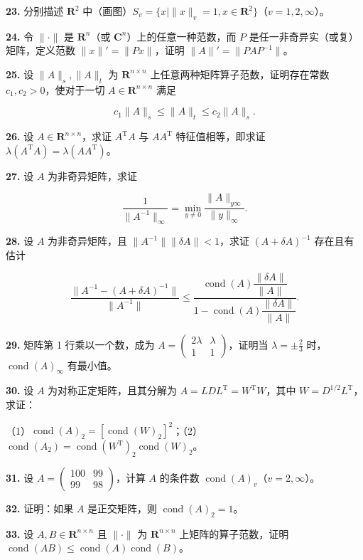 \documentclass[
  10pt,
  fontset=fandol]{ctexart}
\begin{document}
\textbf{23.} 分别描述 \(\mathbf R^2\) 中（画图）\(S_v=\{x\mid\|x\|_v=1,x\in\mathbf R^2\}\)（\(v=1,2,\infty\)）。

\textbf{24.} 令 \(\|\cdot\|\) 是 \(\mathbf R^n\)（或 \(\mathbf C^n\)）上的任意一种范数，而 \(P\) 是任一非奇异实（或复）矩阵，定义范数 \(\|x\|'=\|Px\|\)，证明 \(\|A\|'=\|PAP^{-1}\|\)。

\textbf{25.} 设 \(\|A\|_s,\|A\|_t\) 为 \(\mathbf R^{n\times n}\) 上任意两种矩阵算子范数，证明存在常数 \(c_1,c_2>0\)，使对于一切 \(A\in\mathbf R^{n\times n}\) 满足

\[
c_1\|A\|_s\leqslant\|A\|_t\leqslant c_2\|A\|_s.
\]

\textbf{26.} 设 \(A\in\mathbf R^{n\times n}\)，求证 \(A^{\mathrm T}A\) 与 \(AA^{\mathrm T}\) 特征值相等，即求证 \(\lambda(A^{\mathrm T}A)=\lambda(AA^{\mathrm T})\)。

\textbf{27.} 设 \(A\) 为非奇异矩阵，求证

\[
\frac1{\|A^{-1}\|_\infty}=\min_{y\neq0}\frac{\|A\|_{y\infty}}{\|y\|_\infty}.
\]

\textbf{28.} 设 \(A\) 为非奇异矩阵，且 \(\|A^{-1}\|\|\delta A\|<1\)，求证 \((A+\delta A)^{-1}\) 存在且有估计

\[
\frac{\|A^{-1}-(A+\delta A)^{-1}\|}{\|A^{-1}\|}
\leqslant
\frac{\operatorname{cond}(A)\dfrac{\|\delta A\|}{\|A\|}}
{1-\operatorname{cond}(A)\dfrac{\|\delta A\|}{\|A\|}}.
\]

\textbf{29.} 矩阵第 1 行乘以一个数，成为 \(A=\begin{pmatrix}2\lambda&\lambda\\1&1\end{pmatrix}\)，证明当 \(\lambda=\pm\frac23\) 时，\(\operatorname{cond}(A)_\infty\) 有最小值。

\textbf{30.} 设 \(A\) 为对称正定矩阵，且其分解为 \(A=LDL^{\mathrm T}=W^{\mathrm T}W\)，其中 \(W=D^{1/2}L^{\mathrm T}\)，求证：

（1）\(\operatorname{cond}(A)_2=[\operatorname{cond}(W)_2]^2\)；（2）\(\operatorname{cond}(A_2)=\operatorname{cond}(W^{\mathrm T})_2\operatorname{cond}(W)_2\)。

\textbf{31.} 设 \(A=\begin{pmatrix}100&99\\99&98\end{pmatrix}\)，计算 \(A\) 的条件数 \(\operatorname{cond}(A)_v\)（\(v=2,\infty\)）。

\textbf{32.} 证明：如果 \(A\) 是正交矩阵，则 \(\operatorname{cond}(A)_2=1\)。

\textbf{33.} 设 \(A,B\in\mathbf R^{n\times n}\) 且 \(\|\cdot\|\) 为 \(\mathbf R^{n\times n}\) 上矩阵的算子范数，证明 \(\operatorname{cond}(AB)\leqslant\operatorname{cond}(A)\operatorname{cond}(B)\)。
\end{document}
